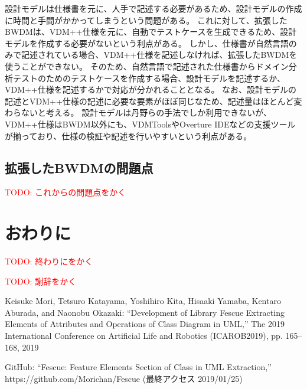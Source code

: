 \documentclass[uplatex, report, a4j, 10pt]{jsbook}
\newcommand\todo[1]{\textcolor{red}{#1}}
\newcommand{\tool}{BWDM}
\begin{document}
設計モデルは仕様書を元に、人手で記述する必要があるため、設計モデルの作成に時間と手間がかかってしまうという問題がある。
これに対して、拡張したBWDMは、VDM++仕様を元に、自動でテストケースを生成できるため、設計モデルを作成する必要がないという利点がある。
しかし、仕様書が自然言語のみで記述されている場合、VDM++仕様を記述しなければ、拡張したBWDMを使うことができない。
そのため、自然言語で記述された仕様書からドメイン分析テストのためのテストケースを作成する場合、設計モデルを記述するか、VDM++仕様を記述するかで対応が分かれることとなる。
なお、設計モデルの記述とVDM++仕様の記述に必要な要素がほぼ同じなため、記述量はほとんど変わらないと考える。
設計モデルは丹野らの手法でしか利用できないが、VDM++仕様はBWDM以外にも、VDMTools\cite{vdmtools}やOverture IDE\cite{overture}などの支援ツールが揃っており、仕様の検証や記述を行いやすいという利点がある。


\section{拡張した\tool{}の問題点}
\todo{TODO: これからの問題点をかく}

\chapter{おわりに} \label{cha:Conclusion}
\todo{TODO: 終わりにをかく}

%
\acknowledgment{}

\todo{TODO: 謝辞をかく}


%
\begin{thebibliography}{99}
   Keisuke Mori, Tetsuro Katayama, Yoshihiro Kita, Hisaaki Yamaba, Kentaro Aburada, and Naonobu Okazaki: ``Development of Library Fescue Extracting Elements of Attributes and Operations of Class Diagram in UML,'' The 2019 International Conference on Artificial Life and Robotics (ICAROB2019), pp. 165--168, 2019

   GitHub: ``Fescue: Feature Elements Section of Class in UML Extraction,'' https://github.com/Morichan/Fescue (最終アクセス 2019/01/25)
\end{thebibliography}

%
\end{document}
